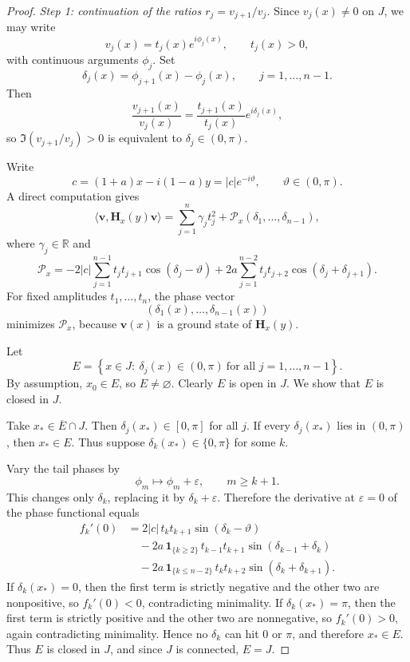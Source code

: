 \documentclass[11pt]{article}
\numberwithin{equation}{section}
\begin{document}
\begin{proof}
\emph{Step 1: continuation of the ratios $r_j=v_{j+1}/v_j$.}
Since $v_j(x)\neq0$ on $J$, we may write
\[
v_j(x)=t_j(x)e^{i\phi_j(x)},
\qquad
t_j(x)>0,
\]
with continuous arguments $\phi_j$.  Set
\[
\delta_j(x)=\phi_{j+1}(x)-\phi_j(x),
\qquad
j=1,\dots,n-1.
\]
Then
\[
\frac{v_{j+1}(x)}{v_j(x)}
=
\frac{t_{j+1}(x)}{t_j(x)}e^{i\delta_j(x)},
\]
so $\Im(v_{j+1}/v_j)>0$ is equivalent to $\delta_j\in(0,\pi)$.

Write
\[
c=(1+a)x-i(1-a)y=|c|e^{-i\vartheta},
\qquad
\vartheta\in(0,\pi).
\]
A direct computation gives
\[
\langle \bm v,\mathbf H_x(y)\bm v\rangle
=
\sum_{j=1}^n \gamma_j t_j^2+\mathcal P_x(\delta_1,\dots,\delta_{n-1}),
\]
where $\gamma_j\in\mathbb{R}$ and
\[
\mathcal P_x
=
-2|c|\sum_{j=1}^{n-1}t_jt_{j+1}\cos(\delta_j-\vartheta)
+
2a\sum_{j=1}^{n-2}t_jt_{j+2}\cos(\delta_j+\delta_{j+1}).
\]
For fixed amplitudes $t_1,\dots,t_n$, the phase vector
\[
(\delta_1(x),\dots,\delta_{n-1}(x))
\]
minimizes $\mathcal P_x$, because $\bm v(x)$ is a ground state of
$\mathbf H_x(y)$.

Let
\[
E=
\left\{
x\in J:\ \delta_j(x)\in(0,\pi)\ \text{for all }j=1,\dots,n-1
\right\}.
\]
By assumption, $x_0\in E$, so $E\neq\varnothing$.  Clearly $E$ is open in $J$.
We show that $E$ is closed in $J$.

Take $x_*\in\overline E\cap J$.  Then $\delta_j(x_*)\in[0,\pi]$ for all $j$.
If every $\delta_j(x_*)$ lies in $(0,\pi)$, then $x_*\in E$.  Thus suppose
$\delta_k(x_*)\in\{0,\pi\}$ for some $k$.

Vary the tail phases by
\[
\phi_m\mapsto \phi_m+\varepsilon,\qquad m\ge k+1.
\]
This changes only $\delta_k$, replacing it by $\delta_k+\varepsilon$.  Therefore the
derivative at $\varepsilon=0$ of the phase functional equals
\begin{align*}
f_k'(0)
&=
2|c|\,t_kt_{k+1}\sin(\delta_k-\vartheta) \\
&\quad
-2a\,\mathbf 1_{\{k\ge2\}}\,t_{k-1}t_{k+1}\sin(\delta_{k-1}+\delta_k) \\
&\quad
-2a\,\mathbf 1_{\{k\le n-2\}}\,t_kt_{k+2}\sin(\delta_k+\delta_{k+1}).
\end{align*}
If $\delta_k(x_*)=0$, then the first term is strictly negative and the other
two are nonpositive, so $f_k'(0)<0$, contradicting minimality.  If
$\delta_k(x_*)=\pi$, then the first term is strictly positive and the other
two are nonnegative, so $f_k'(0)>0$, again contradicting minimality.
Hence no $\delta_k$ can hit $0$ or $\pi$, and therefore $x_*\in E$.
Thus $E$ is closed in $J$, and since $J$ is connected, $E=J$.


\end{proof}
\end{document}
